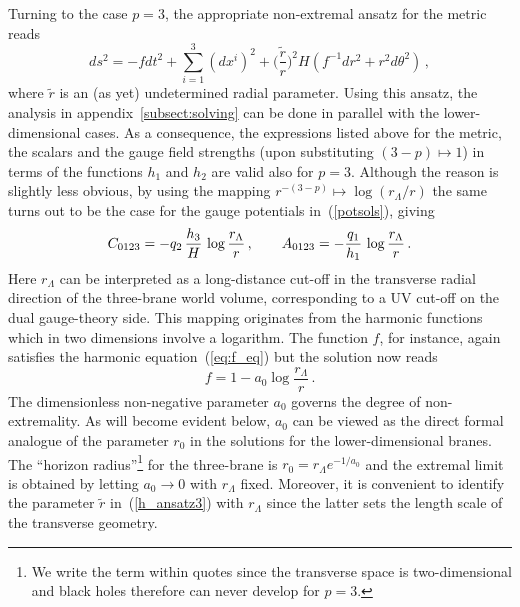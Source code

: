 \documentclass[a4paper,11pt]{article}
\newcommand{\eqref}[1]{(\ref{#1})}
\begin{document}
Turning to the case $p=3$, the appropriate non-extremal ansatz for the
metric reads~\cite{Lu:1997kg}
\begin{equation}
\label{h_ansatz3}
ds^2 = - f dt^2 + \sum_{i=1}^3 (dx^i)^2 +
 \Big(\frac{\tilde{r}}{r}\Big)^2 H \left( f^{-1}dr^2 + r^2 d\theta^2
 \right) \,,
\end{equation}
where $\tilde{r}$ is an (as yet) undetermined radial parameter. Using
this ansatz, the analysis in appendix~\ref{subsect:solving} can be
done in parallel with the lower-dimensional cases. As a consequence,
the expressions listed above for the metric, the scalars and the gauge
field strengths (upon substituting $(3-p)\mapsto1$) in terms of the
functions $h_1$ and $h_2$ are valid also for $p=3$. Although the
reason is slightly less obvious, by using the mapping
$r^{-(3-p)}\mapsto \log(r_\Lambda/r)$ the same turns out to be the
case for the gauge potentials in~\eqref{potsols}, giving
\begin{equation}
\label{potentials3}
C_{0123} = - q_2\,\frac{h_3}{H}\,\log\frac{r_\Lambda}{r} \spa
%
A_{0123} = - \frac{q_1}{h_1}\,\log\frac{r_\Lambda}{r} \,.
\end{equation}
Here $r_\Lambda$ can be interpreted as a long-distance cut-off in the
transverse radial direction of the three-brane world volume,
corresponding to a UV cut-off on the dual gauge-theory side. This
mapping originates from the harmonic functions which in two dimensions
involve a logarithm. The function $f$, for instance, again satisfies
the harmonic equation~\eqref{eq:f_eq} but the solution now reads
\begin{equation}
\label{fresult3}
f= 1 - a_0 \log\frac{r_\Lambda}{r} \,.
\end{equation}
The dimensionless non-negative parameter $a_0$ governs the degree of
non-extremality. As will become evident below, $a_0$ can be viewed as
the direct formal analogue of the parameter $r_0$ in the solutions for
the lower-dimensional branes. The ``horizon radius''\footnote{We write
the term within quotes since the transverse space is two-dimensional
and black holes therefore can never develop for $p=3$.} for the
three-brane is $r_0=r_\Lambda e^{-1/a_0}$ and the extremal limit is
obtained by letting $a_0\rightarrow0$ with $r_\Lambda$
fixed. Moreover, it is convenient to identify the parameter
$\tilde{r}$ in~\eqref{h_ansatz3} with $r_\Lambda$ since the latter
sets the length scale of the transverse geometry.
\end{document}

